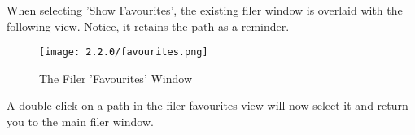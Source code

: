 
   When selecting 'Show Favourites', the existing filer window
   is overlaid with the
   following view. Notice, it retains the path as a reminder.

   \begin{figure}[H]
      \centering
      \texttt{[image: 2.2.0/favourites.png]}
      \caption{The Filer 'Favourites' Window}
      \label{fig:filer_favourites_window}
   \end{figure}

   A double-click on a path in the filer favourites view will now select it and
   return you to the main filer window.

